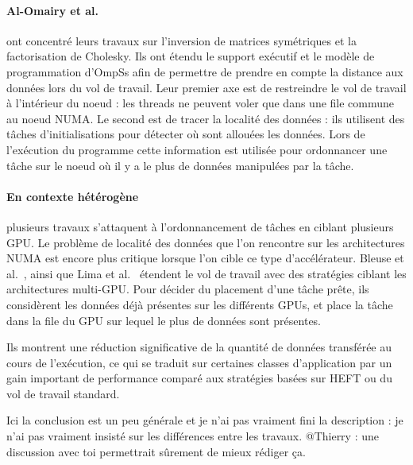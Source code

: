\paragraph{Al-Omairy et al.~\cite{Al-Omairy2015}} ont concentré leurs travaux sur l'inversion de matrices symétriques et la factorisation de Cholesky.
Ils ont étendu le support exécutif et le modèle de programmation d'OmpSs afin de permettre de prendre en compte la distance aux données lors du vol de travail.
Leur premier axe est de restreindre le vol de travail à l'intérieur du noeud : les threads ne peuvent voler que dans une file commune au noeud NUMA.
Le second est de tracer la localité des données : ils utilisent des tâches d'initialisations pour détecter où sont allouées les données. Lors de l'exécution du programme cette information est utilisée pour ordonnancer une tâche sur le noeud où il y a le plus de données manipulées par la tâche.




\paragraph{En contexte hétérogène} plusieurs travaux s'attaquent à l'ordonnancement de tâches en ciblant plusieurs GPU.
Le problème de localité des données que l'on rencontre sur les architectures NUMA est encore plus critique lorsque l'on cible ce type d'accélérateur.
Bleuse et al.~\cite{Bleuse2014}, ainsi que Lima et al.~\cite{Lima2015} étendent le vol de travail avec des stratégies ciblant les architectures multi-GPU.
Pour décider du placement d'une tâche prête, ils considèrent les données déjà présentes sur les différents GPUs, et place la tâche dans la file du GPU sur lequel le plus de données sont présentes.

Ils montrent une réduction significative de la quantité de données transférée au cours de l'exécution, ce qui se traduit sur certaines classes d'application par un gain important de performance comparé aux stratégies basées sur HEFT ou du vol de travail standard.

\begin{todo}
  Ici la conclusion est un peu générale et je n'ai pas vraiment fini la description : je n'ai pas vraiment insisté sur les différences entre les travaux.
  @Thierry : une discussion avec toi permettrait sûrement de mieux rédiger ça.
\end{todo}


